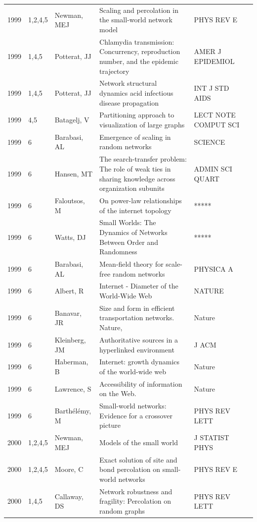 \documentclass[11pt]{article} %
\begin{document}
\begin{longtable}{p{0.8cm}|p{1.25cm}|p{2.8cm}|p{7.5cm}|p{3cm}l}
1999&	1,2,4,5&	Newman, MEJ&	 Scaling and percolation in the small-world network model&         	PHYS REV E\\
1999&	1,4,5&	Potterat, JJ&	 Chlamydia transmission: Concurrency, reproduction number, and the epidemic trajectory&         	AMER J EPIDEMIOL\\
1999&	1,4,5&	Potterat, JJ&	 Network structural dynamics acid infectious disease propagation&         	INT J STD AIDS\\
1999&	4,5&	Batagelj, V&	 Partitioning approach to visualization of large graphs&         	LECT NOTE COMPUT SCI\\
1999&	6&	Barabasi, AL&	 Emergence of scaling in random networks&         	SCIENCE\\
1999&	6&	Hansen, MT&	 The search-transfer problem: The role of weak ties in sharing knowledge across organization subunits&         	ADMIN SCI QUART\\
1999&	6&	Faloutsos, M&	 On power-law relationships of the internet topology&         	*****\\
1999&	6&	Watts, DJ&	 Small Worlds: The Dynamics of Networks Between Order and Randomness&         	*****\\
1999&	6&	Barabasi, AL&	 Mean-field theory for scale-free random networks&         	PHYSICA A\\
1999&	6&	Albert, R&	 Internet - Diameter of the World-Wide Web&         	NATURE\\
1999&	6&	Banavar, JR&	Size and form in efficient transportation networks. Nature,&         	Nature\\
1999&	6&	Kleinberg, JM&	 Authoritative sources in a hyperlinked environment&         	J ACM\\
1999&	6&	Haberman, B&	Internet: growth dynamics of the world-wide web&         	Nature\\
1999&	6&	Lawrence, S&	Accessibility of information on the Web. &         	Nature \\
1999&	6&	Barthélémy, M &	Small-world networks: Evidence for a crossover picture&         	PHYS REV LETT\\
2000&	1,2,4,5&	Newman, MEJ&	 Models of the small world&         	J STATIST PHYS\\
2000&	1,2,4,5&	Moore, C&	 Exact solution of site and bond percolation on small-world networks&         	PHYS REV E\\
2000&	1,4,5&	Callaway, DS&	 Network robustness and fragility: Percolation on random graphs&         	PHYS REV LETT\\

\end{longtable}
\end{document}
